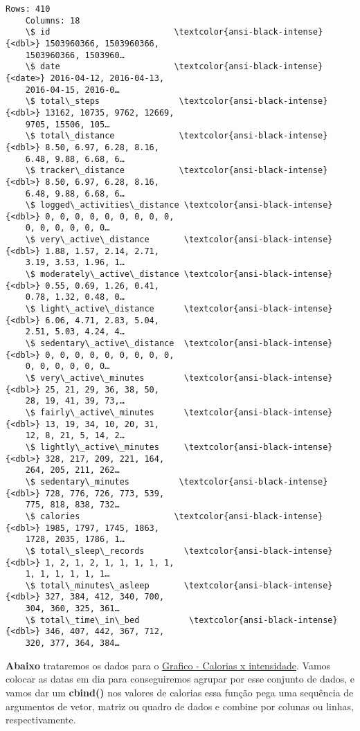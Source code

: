 \begin{Verbatim}[commandchars=\\\{\}]
    Rows: 410
    Columns: 18
    \$ id                         \textcolor{ansi-black-intense}{<dbl>} 1503960366, 1503960366,
    1503960366, 1503960…
    \$ date                       \textcolor{ansi-black-intense}{<date>} 2016-04-12, 2016-04-13,
    2016-04-15, 2016-0…
    \$ total\_steps                \textcolor{ansi-black-intense}{<dbl>} 13162, 10735, 9762, 12669,
    9705, 15506, 105…
    \$ total\_distance             \textcolor{ansi-black-intense}{<dbl>} 8.50, 6.97, 6.28, 8.16,
    6.48, 9.88, 6.68, 6…
    \$ tracker\_distance           \textcolor{ansi-black-intense}{<dbl>} 8.50, 6.97, 6.28, 8.16,
    6.48, 9.88, 6.68, 6…
    \$ logged\_activities\_distance \textcolor{ansi-black-intense}{<dbl>} 0, 0, 0, 0, 0, 0, 0, 0, 0,
    0, 0, 0, 0, 0, 0…
    \$ very\_active\_distance       \textcolor{ansi-black-intense}{<dbl>} 1.88, 1.57, 2.14, 2.71,
    3.19, 3.53, 1.96, 1…
    \$ moderately\_active\_distance \textcolor{ansi-black-intense}{<dbl>} 0.55, 0.69, 1.26, 0.41,
    0.78, 1.32, 0.48, 0…
    \$ light\_active\_distance      \textcolor{ansi-black-intense}{<dbl>} 6.06, 4.71, 2.83, 5.04,
    2.51, 5.03, 4.24, 4…
    \$ sedentary\_active\_distance  \textcolor{ansi-black-intense}{<dbl>} 0, 0, 0, 0, 0, 0, 0, 0, 0,
    0, 0, 0, 0, 0, 0…
    \$ very\_active\_minutes        \textcolor{ansi-black-intense}{<dbl>} 25, 21, 29, 36, 38, 50,
    28, 19, 41, 39, 73,…
    \$ fairly\_active\_minutes      \textcolor{ansi-black-intense}{<dbl>} 13, 19, 34, 10, 20, 31,
    12, 8, 21, 5, 14, 2…
    \$ lightly\_active\_minutes     \textcolor{ansi-black-intense}{<dbl>} 328, 217, 209, 221, 164,
    264, 205, 211, 262…
    \$ sedentary\_minutes          \textcolor{ansi-black-intense}{<dbl>} 728, 776, 726, 773, 539,
    775, 818, 838, 732…
    \$ calories                   \textcolor{ansi-black-intense}{<dbl>} 1985, 1797, 1745, 1863,
    1728, 2035, 1786, 1…
    \$ total\_sleep\_records        \textcolor{ansi-black-intense}{<dbl>} 1, 2, 1, 2, 1, 1, 1, 1, 1,
    1, 1, 1, 1, 1, 1…
    \$ total\_minutes\_asleep       \textcolor{ansi-black-intense}{<dbl>} 327, 384, 412, 340, 700,
    304, 360, 325, 361…
    \$ total\_time\_in\_bed          \textcolor{ansi-black-intense}{<dbl>} 346, 407, 442, 367, 712,
    320, 377, 364, 384…
\end{Verbatim}

\textbf{Abaixo} trataremos os dados para o
\hyperref[subsection4-three]{Grafico - Calorias x intensidade}. Vamos
colocar as datas em dia para conseguiremos agrupar por esse conjunto de
dados, e vamos dar um \textbf{cbind()} nos valores de calorias essa
função pega uma sequência de argumentos de vetor, matriz ou quadro de
dados e combine por colunas ou linhas, respectivamente.

